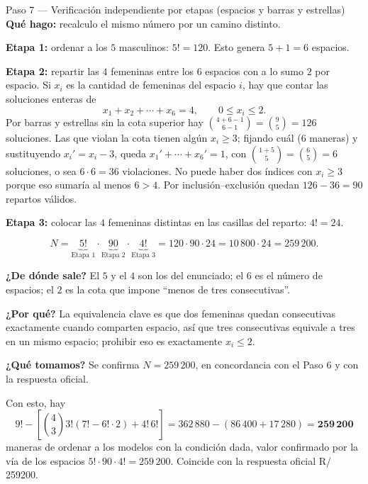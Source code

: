 \documentclass[11pt]{article}
\begin{document}
\begin{paso}{Paso 7 --- Verificación independiente por etapas (espacios y barras y estrellas)}
\textbf{Qué hago:} recalculo el mismo número por un camino distinto.

\medskip
\textbf{Etapa 1:} ordenar a los $5$ masculinos: $5!=120$. Esto genera $5+1=6$ espacios.

\textbf{Etapa 2:} repartir las $4$ femeninas entre los $6$ espacios con a lo sumo $2$ por espacio. Si $x_i$ es la cantidad de femeninas del espacio $i$, hay que contar las soluciones enteras de
\[
  x_1+x_2+\cdots+x_6 = 4,\qquad 0\le x_i\le 2 .
\]
Por barras y estrellas sin la cota superior hay $\binom{4+6-1}{6-1}=\binom{9}{5}=126$ soluciones. Las que violan la cota tienen algún $x_i\ge 3$; fijando cuál ($6$ maneras) y sustituyendo $x_i'=x_i-3$, queda $x_1'+\cdots+x_6'=1$, con $\binom{1+5}{5}=\binom{6}{5}=6$ soluciones, o sea $6\cdot 6=36$ violaciones. No puede haber dos índices con $x_i\ge 3$ porque eso sumaría al menos $6>4$. Por inclusión--exclusión quedan $126-36=90$ repartos válidos.

\textbf{Etapa 3:} colocar las $4$ femeninas distintas en las casillas del reparto: $4!=24$.

\medskip
\[
  N = \underbrace{5!}_{\text{Etapa 1}}\cdot \underbrace{90}_{\text{Etapa 2}} \cdot \underbrace{4!}_{\text{Etapa 3}} = 120\cdot 90\cdot 24 = 10\,800\cdot 24 = 259\,200 .
\]

\textbf{¿De dónde sale?} El $5$ y el $4$ son los del enunciado; el $6$ es el número de espacios; el $2$ es la cota que impone ``menos de tres consecutivas''.

\textbf{¿Por qué?} La equivalencia clave es que dos femeninas quedan consecutivas exactamente cuando comparten espacio, así que tres consecutivas equivale a tres en un mismo espacio; prohibir eso es exactamente $x_i\le 2$.

\textbf{¿Qué tomamos?} Se confirma $N=259\,200$, en concordancia con el Paso 6 y con la respuesta oficial.
\end{paso}

\begin{resp}
Con esto, hay
\[
  9! - \left[\binom{4}{3}3!\left(7!-6!\cdot 2\right) + 4!\,6!\right] = 362\,880-\left(86\,400+17\,280\right) = \mathbf{259\,200}
\]
maneras de ordenar a los modelos con la condición dada, valor confirmado por la vía de los espacios $5!\cdot 90\cdot 4! = 259\,200$. Coincide con la respuesta oficial R/ 259200.
\end{resp}
\end{document}
